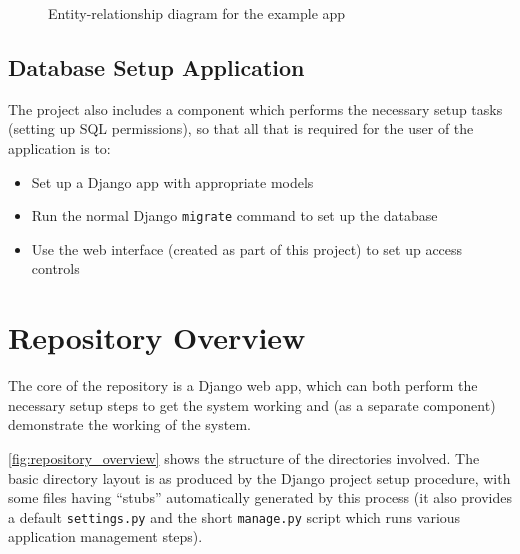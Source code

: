\documentclass[12pt]{report}
\begin{document}
\begin{figure}[ht]
\begin{center}
  \end{center}
  \caption{Entity-relationship diagram for the example app}
  \label{fig:entity-relationship}
\end{figure}

\subsection{Database Setup Application}
The project also includes a component which performs the necessary setup tasks (setting up SQL permissions), so that all that is required for the user of the application is to:
\begin{itemize}
\item
  Set up a Django app with appropriate models
\item
  Run the normal Django \texttt{migrate} command to set up the database
\item
  Use the web interface (created as part of this project) to set up access controls
\end{itemize}

\section{Repository Overview}
The core of the repository is a Django web app, which can both perform the necessary setup steps to get the system working and (as a separate component) demonstrate the working of the system.

\autoref{fig:repository_overview} shows the structure of the directories involved. The basic directory layout is as produced by the Django project setup procedure, with some files having ``stubs'' automatically generated by this process (it also provides a default \texttt{settings.py} and the short \texttt{manage.py} script which runs various application management steps).
\end{document}
